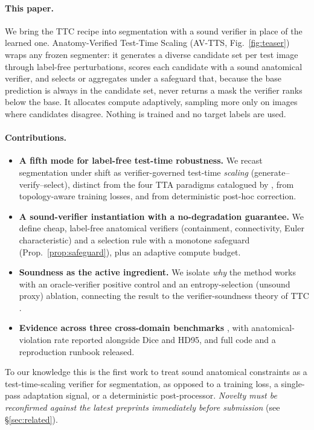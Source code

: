 \documentclass[10pt,twocolumn]{article}
\begin{document}
\paragraph{This paper.} We bring the TTC recipe into segmentation with a sound verifier in place of the learned one. Anatomy-Verified Test-Time Scaling (AV-TTS, Fig.~\ref{fig:teaser}) wraps any frozen segmenter: it generates a diverse candidate set per test image through label-free perturbations, scores each candidate with a sound anatomical verifier, and selects or aggregates under a safeguard that, because the base prediction is always in the candidate set, never returns a mask the verifier ranks below the base. It allocates compute adaptively, sampling more only on images where candidates disagree. Nothing is trained and no target labels are used.

\paragraph{Contributions.}
\begin{itemize}\setlength\itemsep{0.15em}
\item \textbf{A fifth mode for label-free test-time robustness.} We recast segmentation under shift as verifier-governed test-time \emph{scaling} (generate--verify--select), distinct from the four TTA paradigms catalogued by \citet{yu2025medsegtta}, from topology-aware training losses, and from deterministic post-hoc correction.
\item \textbf{A sound-verifier instantiation with a no-degradation guarantee.} We define cheap, label-free anatomical verifiers (containment, connectivity, Euler characteristic) and a selection rule with a monotone safeguard (Prop.~\ref{prop:safeguard}), plus an adaptive compute budget.
\item \textbf{Soundness as the active ingredient.} We isolate \emph{why} the method works with an oracle-verifier positive control and an entropy-selection (unsound proxy) ablation, connecting the result to the verifier-soundness theory of TTC \citep{stroebl2024verifier,setlur2025verifier}.
\item \textbf{Evidence across three cross-domain benchmarks} , with anatomical-violation rate reported alongside Dice and HD95, and full code and a reproduction runbook released.
\end{itemize}
To our knowledge this is the first work to treat sound anatomical constraints as a test-time-scaling verifier for segmentation, as opposed to a training loss, a single-pass adaptation signal, or a deterministic post-processor. \emph{Novelty must be reconfirmed against the latest preprints immediately before submission} (see \S\ref{sec:related}).
\end{document}
